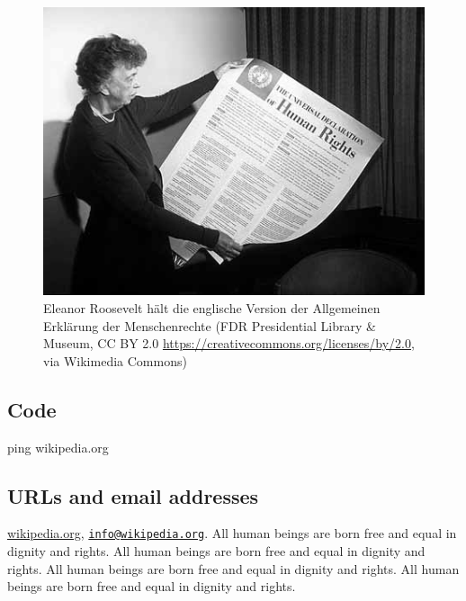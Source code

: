 \documentclass[
]{beamer}
\newenvironment{Shaded}{}{}
\newcommand{\FunctionTok}[1]{\textcolor[rgb]{0.02,0.16,0.49}{#1}}
\newcommand{\NormalTok}[1]{#1}
\begin{document}
\begin{figure}
\centering
\includegraphics[width=\textwidth,height=0.6\textheight]{images/Eleanor_Roosevelt_and_Human_Rights_Declaration.jpeg}
\caption{Eleanor Roosevelt hält die englische Version der Allgemeinen
Erklärung der Menschenrechte (FDR Presidential Library \& Museum, CC BY
2.0 \url{https://creativecommons.org/licenses/by/2.0}, via Wikimedia
Commons)}
\end{figure}

\hypertarget{code}{%
\subsection{Code}\label{code}}

\begin{Shaded}
\begin{Highlighting}[]
\FunctionTok{ping}\NormalTok{ wikipedia.org}
\end{Highlighting}
\end{Shaded}

\hypertarget{urls-and-email-addresses}{%
\subsection{URLs and email addresses}\label{urls-and-email-addresses}}

\href{https://www.wikipedia.org/}{wikipedia.org},
\href{mailto:info@wikipedia.org}{\nolinkurl{info@wikipedia.org}}. All
human beings are born free and equal in dignity and rights. All human
beings are born free and equal in dignity and rights. All human beings
are born free and equal in dignity and rights. All human beings are born
free and equal in dignity and rights.
\end{document}
